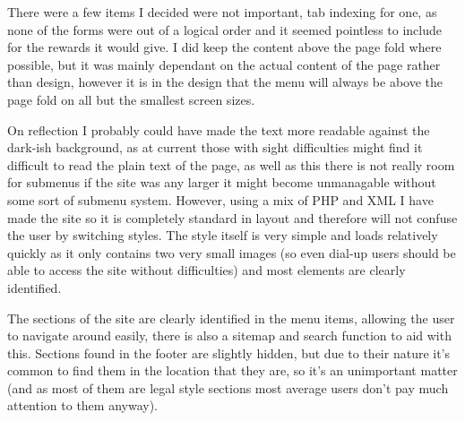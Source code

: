\documentclass[10pt,letterpaper]{article}
\begin{document}
	There were a few items I decided were not important, tab indexing for one, as none of the forms were out of a logical order and it seemed pointless to include for the rewards it would give. I did keep the content above the page fold where possible, but it was mainly dependant on the actual content of the page rather than design, however it is in the design that the menu will always be above the page fold on all but the smallest screen sizes.

	On reflection I probably could have made the text more readable against the dark-ish background, as at current those with sight difficulties might find it difficult to read the plain text of the page, as well as this there is not really room for submenus if the site was any larger it might become unmanagable without some sort of submenu system. However, using a mix of PHP and XML I have made the site so it is completely standard in layout and therefore will not confuse the user by switching styles. The style itself is very simple and loads relatively quickly as it only contains two very small images (so even dial-up users should be able to access the site without difficulties) and most elements are clearly identified.

	The sections of the site are clearly identified in the menu items, allowing the user to navigate around easily, there is also a sitemap and search function to aid with this. Sections found in the footer are slightly hidden, but due to their nature it's common to find them in the location that they are, so it's an unimportant matter (and as most of them are legal style sections most average users don't pay much attention to them anyway).

	



\end{document}
